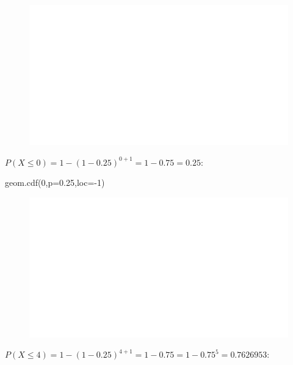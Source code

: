 \documentclass[
  letterpaper,
  DIV=11,
  numbers=noendperiod]{scrreprt}
\newenvironment{Shaded}{\begin{snugshade}}{\end{snugshade}}
\newcommand{\DecValTok}[1]{\textcolor[rgb]{0.68,0.00,0.00}{#1}}
\newcommand{\FloatTok}[1]{\textcolor[rgb]{0.68,0.00,0.00}{#1}}
\newcommand{\NormalTok}[1]{\textcolor[rgb]{0.00,0.23,0.31}{#1}}
\newcommand{\OperatorTok}[1]{\textcolor[rgb]{0.37,0.37,0.37}{#1}}
\begin{document}
\begin{figure}[H]

{\centering \includegraphics{3_files/figure-pdf/py_geom_funciones1-3.pdf}

}

\end{figure}

\(P(X\leq 0)=1- (1-0.25)^{0+1}=1-0.75=0.25\):

\begin{Shaded}
\begin{Highlighting}[]
\NormalTok{geom.cdf(}\DecValTok{0}\NormalTok{,p}\OperatorTok{=}\FloatTok{0.25}\NormalTok{,loc}\OperatorTok{={-}}\DecValTok{1}\NormalTok{)}
\end{Highlighting}
\end{Shaded}

\begin{figure}[H]

{\centering \includegraphics{3_files/figure-pdf/py_geom_funciones2-5.pdf}

}

\end{figure}

\(P(X\leq 4)=1-(1-0.25)^{4+1}=1-0.75=1-0.75^5=0.7626953\):
\end{document}
